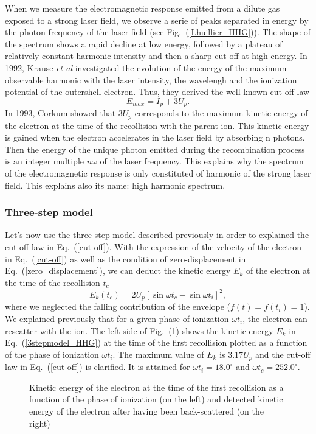 \documentclass[a4paper]{article}
\begin{document}
When we measure the electromagnetic response emitted from a dilute gas exposed to a strong laser field, we observe a serie of peaks separated in energy by the photon frequency of the laser field (see Fig.~(\ref{Lhuillier_HHG})). The shape of the spectrum shows a rapid decline at low energy, followed by a plateau of relatively constant harmonic intensity and then a sharp cut-off at high energy.
In 1992, Krause \textit{et al} \cite{Krause_1992} investigated the evolution of the energy of the maximum observable harmonic with the laser intensity, the wavelengh and the ionization potential of the outershell electron. Thus, they derived the well-known cut-off law
\begin{equation}
\label{cut-off}
E_{max}=I_{p}+3U_{p}.
\end{equation}
In 1993, Corkum \cite{Corkum_1993} showed that $3U_{p}$ corresponds to the maximum kinetic energy of the electron at the time of the recollision with the parent ion. This kinetic energy is gained when the electron accelerates in the laser field by absorbing n photons. Then the energy of the unique photon emitted during the recombination process is an integer multiple $n\omega$ of the laser frequency. This explains why the spectrum of the electromagnetic response is only constituted of harmonic of the strong laser field. This explains also its name: high harmonic spectrum.

\subsubsection{Three-step model}

Let's now use the three-step model described previously in order to explained the cut-off law in Eq.~(\ref{cut-off}).
With the expression of the velocity of the electron in Eq.~(\ref{cut-off}) as well as the condition of zero-displacement in Eq.~(\ref{zero_displacement}), we can deduct the kinetic energy $E_{k}$ of the electron at the time of the recollision $t_{c}$
\begin{equation}
\label{3stepmodel_HHG}
E_{k}(t_{c})=2U_{p}\left[ \sin{\omega t_{c}}-\sin{\omega t_{i}}\right ]^{2},
\end{equation}
where we neglected the falling contribution of the envelope ($f(t)=f(t_{i})=1$). \\
We explained previously that for a given phase of ionization $\omega t_{i}$, the electron can rescatter with the ion. 
The left side of Fig.~(\ref{kinetic_energy}) shows the kinetic energy $E_{k}$ in Eq.~(\ref{3stepmodel_HHG}) at the time of the first recollision plotted as a function of the phase of ionization $\omega t_{i}$. The maximum value of $E_{k}$ is $3.17U_{p}$ and the cut-off law in Eq.~(\ref{cut-off}) is clarified. It is attained for $\omega t_{i}=18.0^{\circ}$ and $\omega t_{c}=252.0^{\circ}$. \\
\begin{figure}
\centering
 
 \caption{Kinetic energy of the electron at the time of the first recollision as a function of the phase of ionization (on the left) and detected kinetic energy of the electron after having been back-scattered (on the right)}
 \label{kinetic_energy} 
\end{figure}
\end{document}
